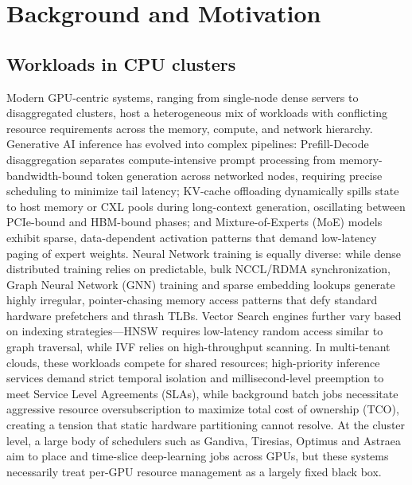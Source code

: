 \section{Background and Motivation}

\subsection{Workloads in CPU clusters}

Modern GPU-centric systems, ranging from single-node dense servers to disaggregated clusters, host a heterogeneous mix of workloads with conflicting resource requirements across the memory, compute, and network hierarchy. 
Generative AI inference has evolved into complex pipelines: Prefill-Decode disaggregation separates compute-intensive prompt processing from memory-bandwidth-bound token generation across networked nodes, requiring precise scheduling to minimize tail latency; KV-cache offloading dynamically spills state to host memory or CXL pools during long-context generation, oscillating between PCIe-bound and HBM-bound phases; and Mixture-of-Experts (MoE) models exhibit sparse, data-dependent activation patterns that demand low-latency paging of expert weights. Neural Network training is equally diverse: while dense distributed training relies on predictable, bulk NCCL/RDMA synchronization, Graph Neural Network (GNN) training and sparse embedding lookups generate highly irregular, pointer-chasing memory access patterns that defy standard hardware prefetchers and thrash TLBs. Vector Search engines further vary based on indexing strategies---HNSW requires low-latency random access similar to graph traversal, while IVF relies on high-throughput scanning. 
In multi-tenant clouds, these workloads compete for shared resources; high-priority inference services demand strict temporal isolation and millisecond-level preemption to meet Service Level Agreements (SLAs), while background batch jobs necessitate aggressive resource oversubscription to maximize total cost of ownership (TCO), creating a tension that static hardware partitioning cannot resolve. 
At the cluster level, a large body of schedulers such as Gandiva, Tiresias, Optimus and Astraea~\cite{gandiva,tiresias,optimus,astraea} aim to place and time-slice deep-learning jobs across GPUs, but these systems necessarily treat per-GPU resource management as a largely fixed black box.

